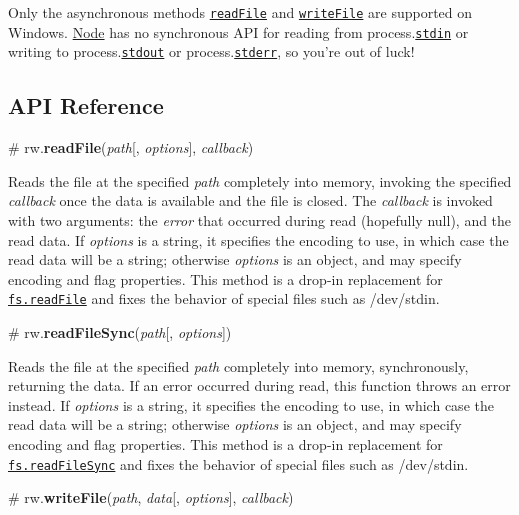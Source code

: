 Only the asynchronous methods \href{#readFile}{\tt read\+File} and \href{#writeFile}{\tt write\+File} are supported on Windows. \mbox{\hyperlink{classNode}{Node}} has no synchronous A\+PI for reading from process.\href{https://nodejs.org/api/process.html#process_process_stdin}{\tt stdin} or writing to process.\href{https://nodejs.org/api/process.html#process_process_stdout}{\tt stdout} or process.\href{https://nodejs.org/api/process.html#process_process_stderr}{\tt stderr}, so you’re out of luck!

\subsection*{A\+PI Reference}

\label{_readFile}%
\# rw.{\bfseries read\+File}({\itshape path}\mbox{[}, {\itshape options}\mbox{]}, {\itshape callback})

Reads the file at the specified {\itshape path} completely into memory, invoking the specified {\itshape callback} once the data is available and the file is closed. The {\itshape callback} is invoked with two arguments\+: the {\itshape error} that occurred during read (hopefully null), and the read data. If {\itshape options} is a string, it specifies the encoding to use, in which case the read data will be a string; otherwise {\itshape options} is an object, and may specify encoding and flag properties. This method is a drop-\/in replacement for \href{https://nodejs.org/api/fs.html#fs_fs_readfile_file_options_callback}{\tt fs.\+read\+File} and fixes the behavior of special files such as /dev/stdin.

\label{_readFileSync}%
\# rw.{\bfseries read\+File\+Sync}({\itshape path}\mbox{[}, {\itshape options}\mbox{]})

Reads the file at the specified {\itshape path} completely into memory, synchronously, returning the data. If an error occurred during read, this function throws an error instead. If {\itshape options} is a string, it specifies the encoding to use, in which case the read data will be a string; otherwise {\itshape options} is an object, and may specify encoding and flag properties. This method is a drop-\/in replacement for \href{https://nodejs.org/api/fs.html#fs_fs_readfilesync_file_options}{\tt fs.\+read\+File\+Sync} and fixes the behavior of special files such as /dev/stdin.

\label{_writeFile}%
\# rw.{\bfseries write\+File}({\itshape path}, {\itshape data}\mbox{[}, {\itshape options}\mbox{]}, {\itshape callback})

